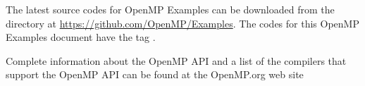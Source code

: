 The latest source codes for OpenMP Examples can be downloaded from the 
directory at
\href{https://github.com/OpenMP/Examples}{https://github.com/OpenMP/Examples}.
The codes for this OpenMP \VER{} Examples document have the tag .


Complete information about the OpenMP API and a list of the compilers that support
the OpenMP API can be found at the OpenMP.org web site




